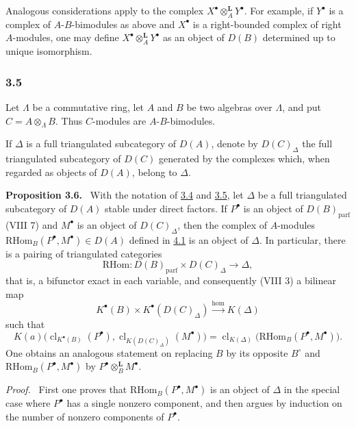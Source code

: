 \documentclass[11pt]{article}
\newenvironment{statement}[1]{\par\medskip\noindent\textbf{#1.}\ }{\par\medskip}
\newenvironment{prooftext}[1][Proof]{\par\noindent\emph{#1.}\ }{\par\medskip}
\providecommand{\RHom}{\mathrm{RHom}}
\providecommand{\cl}{\operatorname{cl}}
\providecommand{\parf}{\mathrm{parf}}
\providecommand{\RHom}{\mathrm{RHom}}
\providecommand{\RHom}{\mathrm R\mathcal{H}om}
\providecommand{\cl}{\operatorname{cl}}
\providecommand{\parf}{\mathrm{parf}}
\providecommand{\RHom}{\mathrm{RHom}}
\providecommand{\cl}{\operatorname{cl}}
\begin{document}
Analogous considerations apply to the complex $X^\bullet\otimes_A^{\mathbf L}Y^\bullet$. For example, if $Y^\bullet$ is a complex of $A$-$B$-bimodules as above and $X^\bullet$ is a right-bounded complex of right $A$-modules, one may define $X^\bullet\otimes_A^{\mathbf L}Y^\bullet$ as an object of $D(B)$ determined up to unique isomorphism.

\subsubsection*{3.5}\label{sga5:X:subsubsection:3.5}

Let $\Lambda$ be a commutative ring, let $A$ and $B$ be two algebras over $\Lambda$, and put $C=A\otimes_\Lambda B$. Thus $C$-modules are $A$-$B$-bimodules.

If $\Delta$ is a full triangulated subcategory of $D(A)$, denote by $D(C)_{\Delta}$ the full triangulated subcategory of $D(C)$ generated by the complexes which, when regarded as objects of $D(A)$, belong to $\Delta$.

\label{sga5:X:proposition:3.6}\begin{statement}{Proposition 3.6}
With the notation of \hyperref[sga5:X:subsubsection:3.4]{3.4} and \hyperref[sga5:X:subsubsection:3.5]{3.5}, let $\Delta$ be a full triangulated subcategory of $D(A)$ stable under direct factors. If $P^\bullet$ is an object of $D(B)_{\parf}$ (VIII 7) and $M^\bullet$ is an object of $D(C)_{\Delta}$, then the complex of $A$-modules $\RHom_B(P^\bullet,M^\bullet)\in D(A)$ defined in \hyperref[sga5:X:lemma:4.1]{4.1} is an object of $\Delta$. In particular, there is a pairing of triangulated categories
\[
\RHom:D(B)_{\parf}\times D(C)_{\Delta}\longrightarrow \Delta,
\tag{3.6.1}\label{sga5:X:equation:3.6.1}
\]
that is, a bifunctor exact in each variable, and consequently (VIII 3) a bilinear map
\[
K^{\bullet}(B)\times K^{\bullet}(D(C)_{\Delta})\xrightarrow{\operatorname{hom}} K(\Delta)
\tag{3.6.2}\label{sga5:X:equation:3.6.2}
\]
such that
\[
K(a)\bigl(\cl_{K^{\bullet}(B)}(P^\bullet),\cl_{K(D(C)_{\Delta})}(M^\bullet)\bigr)
=\cl_{K(\Delta)}\bigl(\RHom_B(P^\bullet,M^\bullet)\bigr).
\tag{3.6.3}\label{sga5:X:equation:3.6.3}
\]
One obtains an analogous statement on replacing $B$ by its opposite $B^\circ$ and $\RHom_B(P^\bullet,M^\bullet)$ by $P^\bullet\otimes_B^{\mathbf L}M^\bullet$.
\end{statement}

\begin{prooftext}[Proof]
First one proves that $\RHom_B(P^\bullet,M^\bullet)$ is an object of $\Delta$ in the special case where $P^\bullet$ has a single nonzero component, and then argues by induction on the number of nonzero components of $P^\bullet$.
\end{prooftext}
\end{document}
